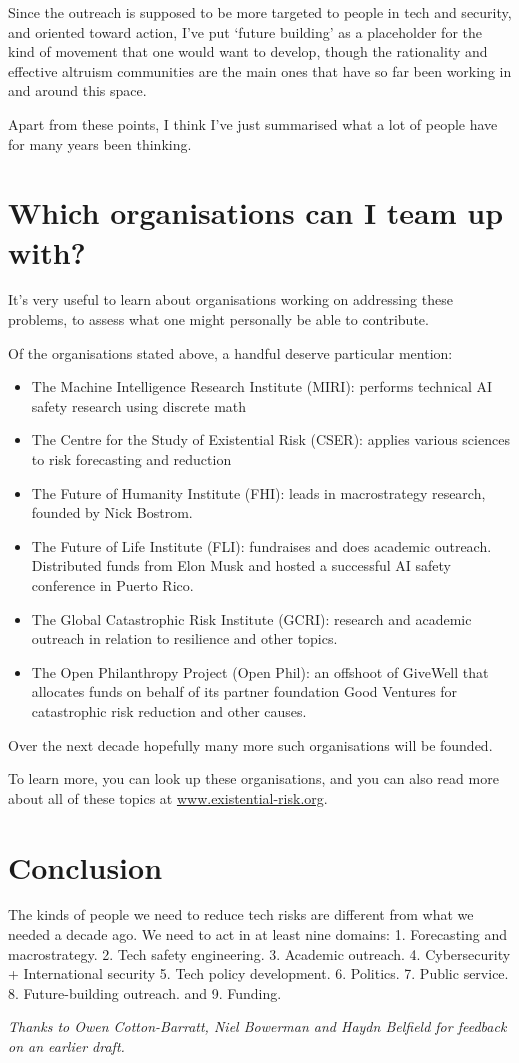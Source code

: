 \documentclass[12pt]{article}
\begin{document}
Since the outreach is supposed to be more targeted to people in tech and security, and oriented toward action, I've put `future building' as a placeholder for the kind of movement that one would want to develop, though the rationality and effective altruism communities are the main ones that have so far been working in and around this space.

Apart from these points, I think I've just summarised what a lot of people have for many years been thinking.
\section{Which organisations can I team up with?}
It's very useful to learn about organisations working on addressing these problems, to assess what one might personally be able to contribute.

Of the organisations stated above, a handful deserve particular mention:
\begin{itemize}
    \item The Machine Intelligence Research Institute (MIRI): performs technical AI safety research using discrete math
    \item The Centre for the Study of Existential Risk (CSER): applies various sciences to risk forecasting and reduction
    \item The Future of Humanity Institute (FHI): leads in macrostrategy research, founded by Nick Bostrom.
    \item The Future of Life Institute (FLI): fundraises and does academic outreach. Distributed funds from Elon Musk and hosted a successful AI safety conference in Puerto Rico.
    \item The Global Catastrophic Risk Institute (GCRI): research and academic outreach in relation to resilience and other topics.
    \item The Open Philanthropy Project (Open Phil): an offshoot of GiveWell that allocates funds on behalf of its partner foundation Good Ventures for catastrophic risk reduction and other causes.
\end{itemize}

Over the next decade hopefully many more such organisations will be founded.

To learn more, you can look up these organisations, 
and you can also read more about all of these topics 
at \href{www.existential-risk.org}{www.existential-risk.org}.

\section{Conclusion}
The kinds of people we need to reduce tech risks are different from what we needed a decade ago. We need to act in at least nine domains: 1. Forecasting and macrostrategy. 2. Tech safety engineering. 3. Academic outreach. 4. Cybersecurity + International security 5. Tech policy development. 6. Politics. 7. Public service. 8. Future-building outreach. and 9. Funding.

\vspace{3em}

{\itshape Thanks to Owen Cotton-Barratt, Niel Bowerman and Haydn Belfield for feedback on an earlier draft.}
\end{document}
